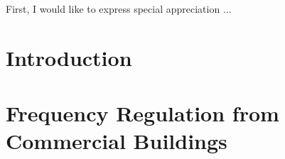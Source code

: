 \documentclass[12pt, oneside, final]{lib/ucthesis}
\def\ssp{\def\baselinestretch{1.0}\large\normalsize}
\begin{document}
\begin{acknowledgements}
\thispagestyle{plain}

First, I would like to express special appreciation ...

\end{acknowledgements}




\begin{dissertationText}
\chapter{Introduction}
	
%	
\chapter{Frequency Regulation from Commercial Buildings}
	
%  
%  
%  

\ssp	%



%	

\end{dissertationText}
\end{document}
